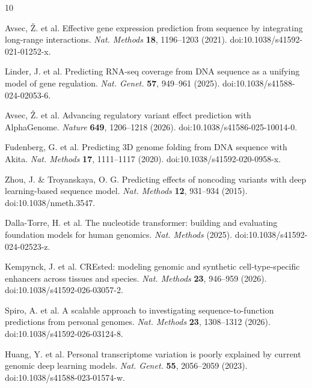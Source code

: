 \documentclass[pdflatex,sn-nature]{sn-jnl}
\begin{document}
\begin{thebibliography}{10}

Avsec, \v{Z}. et al. Effective gene expression prediction from sequence by
integrating long-range interactions. \textit{Nat. Methods} \textbf{18},
1196--1203 (2021). doi:10.1038/s41592-021-01252-x.

Linder, J. et al. Predicting RNA-seq coverage from DNA sequence as a unifying
model of gene regulation. \textit{Nat. Genet.} \textbf{57}, 949--961 (2025).
doi:10.1038/s41588-024-02053-6.

Avsec, \v{Z}. et al. Advancing regulatory variant effect prediction with
AlphaGenome. \textit{Nature} \textbf{649}, 1206--1218 (2026).
doi:10.1038/s41586-025-10014-0.

Fudenberg, G. et al. Predicting 3D genome folding from DNA sequence with
Akita. \textit{Nat. Methods} \textbf{17}, 1111--1117 (2020).
doi:10.1038/s41592-020-0958-x.

Zhou, J. \& Troyanskaya, O. G. Predicting effects of noncoding variants with
deep learning-based sequence model. \textit{Nat. Methods} \textbf{12},
931--934 (2015). doi:10.1038/nmeth.3547.

Dalla-Torre, H. et al. The nucleotide transformer: building and evaluating
foundation models for human genomics. \textit{Nat. Methods} (2025).
doi:10.1038/s41592-024-02523-z.

Kempynck, J. et al. CREsted: modeling genomic and synthetic cell-type-specific
enhancers across tissues and species. \textit{Nat. Methods} \textbf{23},
946--959 (2026). doi:10.1038/s41592-026-03057-2.

Spiro, A. et al. A scalable approach to investigating sequence-to-function
predictions from personal genomes. \textit{Nat. Methods} \textbf{23},
1308--1312 (2026). doi:10.1038/s41592-026-03124-8.

Huang, Y. et al. Personal transcriptome variation is poorly explained by
current genomic deep learning models. \textit{Nat. Genet.} \textbf{55},
2056--2059 (2023).
doi:10.1038/s41588-023-01574-w.

\end{thebibliography}
\end{document}
